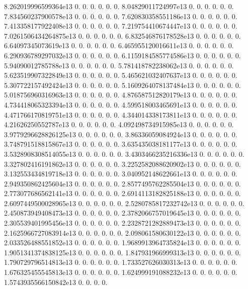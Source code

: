 8.\+262019996599364e13 0. 0. 0. 0. 0. 0. 8.\+04829011724997e13 0. 0. 0. 0. 0. 0. 7.\+834560237900578e13 0. 0. 0. 0. 0. 0. 7.\+620830358551186e13 0. 0. 0. 0. 0. 0. 7.\+413358177922408e13 0. 0. 0. 0. 0. 0. 7.\+219754410674447e13 0. 0. 0. 0. 0. 0. 7.\+0261506434264875e13 0. 0. 0. 0. 0. 0. 6.\+832546876178528e13 0. 0. 0. 0. 0. 0. 6.\+64097345073619e13 0. 0. 0. 0. 0. 0. 6.\+465955120016611e13 0. 0. 0. 0. 0. 0. 6.\+290936789297032e13 0. 0. 0. 0. 0. 0. 6.\+1159184585774586e13 0. 0. 0. 0. 0. 0. 5.\+94090012785788e13 0. 0. 0. 0. 0. 0. 5.\+781418782238062e13 0. 0. 0. 0. 0. 0. 5.\+623519907322849e13 0. 0. 0. 0. 0. 0. 5.\+465621032407637e13 0. 0. 0. 0. 0. 0. 5.\+307722157492424e13 0. 0. 0. 0. 0. 0. 5.\+1609264078137484e13 0. 0. 0. 0. 0. 0. 5.\+018756960316963e13 0. 0. 0. 0. 0. 0. 4.\+876587512820179e13 0. 0. 0. 0. 0. 0. 4.\+734418065323394e13 0. 0. 0. 0. 0. 0. 4.\+599518003465691e13 0. 0. 0. 0. 0. 0. 4.\+471766170819751e13 0. 0. 0. 0. 0. 0. 4.\+344014338173811e13 0. 0. 0. 0. 0. 0. 4.\+21626250552787e13 0. 0. 0. 0. 0. 0. 4.\+092498734915985e13 0. 0. 0. 0. 0. 0. 3.\+9779296628826125e13 0. 0. 0. 0. 0. 0. 3.\+86336059084924e13 0. 0. 0. 0. 0. 0. 3.\+748791518815867e13 0. 0. 0. 0. 0. 0. 3.\+635435038181177e13 0. 0. 0. 0. 0. 0. 3.\+5328908308514055e13 0. 0. 0. 0. 0. 0. 3.\+4303466235216336e13 0. 0. 0. 0. 0. 0. 3.\+327802416191862e13 0. 0. 0. 0. 0. 0. 3.\+2252582088620902e13 0. 0. 0. 0. 0. 0. 3.\+132553434819718e13 0. 0. 0. 0. 0. 0. 3.\+040952148622661e13 0. 0. 0. 0. 0. 0. 2.\+949350862425604e13 0. 0. 0. 0. 0. 0. 2.\+8577495762285504e13 0. 0. 0. 0. 0. 0. 2.\+773077686562141e13 0. 0. 0. 0. 0. 0. 2.\+6914113182825188e13 0. 0. 0. 0. 0. 0. 2.\+6097449500028965e13 0. 0. 0. 0. 0. 0. 2.\+5280785817232742e13 0. 0. 0. 0. 0. 0. 2.\+450873949408473e13 0. 0. 0. 0. 0. 0. 2.\+3782066757019645e13 0. 0. 0. 0. 0. 0. 2.\+305539401995456e13 0. 0. 0. 0. 0. 0. 2.\+2328721282889473e13 0. 0. 0. 0. 0. 0. 2.\+1625966727083914e13 0. 0. 0. 0. 0. 0. 2.\+098061580630122e13 0. 0. 0. 0. 0. 0. 2.\+033526488551852e13 0. 0. 0. 0. 0. 0. 1.\+9689913964735824e13 0. 0. 0. 0. 0. 0. 1.\+9051341374838125e13 0. 0. 0. 0. 0. 0. 1.\+847931966999313e13 0. 0. 0. 0. 0. 0. 1.\+790729796514813e13 0. 0. 0. 0. 0. 0. 1.\+733527626030313e13 0. 0. 0. 0. 0. 0. 1.\+676325455545813e13 0. 0. 0. 0. 0. 0. 1.\+624999191088232e13 0. 0. 0. 0. 0. 0. 1.\+5743935566150842e13 0. 0. 0. 0. 
